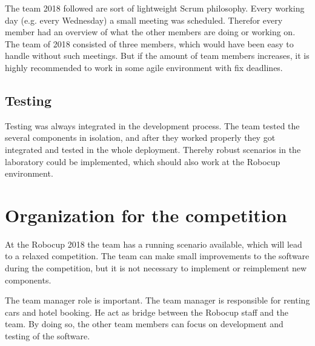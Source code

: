 The team 2018 followed are sort of lightweight Scrum philosophy. Every working day (e.g. every Wednesday) a small meeting was scheduled. Therefor every member had an overview of what the other members are doing or working on. The team of 2018 consisted of three members, which would have been easy to handle without such meetings. But if the amount of team members increases, it is highly recommended to work in some agile environment with fix deadlines.

\subsection{Testing}

Testing was always integrated in the development process. The team tested the several components in isolation, and after they worked properly they got integrated and tested in the whole deployment. Thereby robust scenarios in the laboratory could be implemented, which should also work at the Robocup environment.

 
\section{Organization for the competition}

At the Robocup 2018 the team has a running scenario available, which will lead to a relaxed competition. The team can make small improvements to the software during the competition, but it is not necessary to implement or reimplement new components. 

The team manager role is important. The team manager is responsible for renting cars and hotel booking. He act as bridge between the Robocup staff and the team. By doing so, the other team members can focus on development and testing of the software.
 
